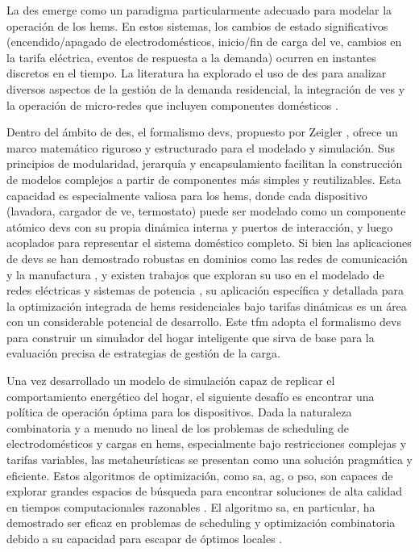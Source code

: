 \documentclass[11pt,a4paper]{book}
\begin{document}
La \gls{des} emerge como un paradigma particularmente adecuado para modelar la operación de los \gls{hems}. En estos sistemas, los cambios de estado significativos (encendido/apagado de electrodomésticos, inicio/fin de carga del \gls{ve}, cambios en la tarifa eléctrica, eventos de respuesta a la demanda) ocurren en instantes discretos en el tiempo. La literatura ha explorado el uso de \gls{des} para analizar diversos aspectos de la gestión de la demanda residencial, la integración de \gls{ves} y la operación de micro-redes que incluyen componentes domésticos \cite{Lasseter2002, Pipattanasomporn2009}.

Dentro del ámbito de \gls{des}, el formalismo \gls{devs}, propuesto por Zeigler \cite{Zeigler2018}, ofrece un marco matemático riguroso y estructurado para el modelado y \mbox{simulación}. Sus principios de modularidad, jerarquía y encapsulamiento \mbox{facilitan} la construcción de modelos complejos a partir de componentes más simples y \mbox{reutilizables}. Esta capacidad es especialmente valiosa para los \gls{hems}, donde cada dispositivo (lavadora, cargador de \gls{ve}, termostato) puede ser modelado como un componente atómico \gls{devs} con su propia dinámica interna y puertos de interacción, y luego acoplados para representar el sistema doméstico completo. Si bien las aplicaciones de \gls{devs} se han demostrado robustas en dominios como las redes de comunicación y la manufactura \cite{Wainer2013, Liu2008}, y existen trabajos que exploran su uso en el modelado de redes eléctricas y sistemas de potencia \cite{AlHammouri2007, Nutaro2010}, su aplicación específica y detallada para la optimización integrada de \gls{hems} residenciales bajo tarifas dinámicas es un área con un considerable potencial de desarrollo. Este \gls{tfm} adopta el formalismo \gls{devs} para construir un simulador del hogar inteligente que sirva de base para la evaluación precisa de estrategias de gestión de la carga.

Una vez desarrollado un modelo de simulación capaz de replicar el comportamiento energético del hogar, el siguiente desafío es encontrar una política de operación óptima para los dispositivos. Dada la naturaleza combinatoria y a menudo no lineal de los problemas de scheduling de electrodomésticos y cargas en \gls{hems}, especialmente bajo restricciones complejas y tarifas variables, las metaheurísticas se presentan como una solución pragmática y eficiente. Estos algoritmos de optimización, como \gls{sa}, \gls{ag}, o \gls{pso}, son capaces de explorar grandes espacios de búsqueda para encontrar soluciones de alta calidad en tiempos computacionales razonables \cite{Talbi2009}. El algoritmo \gls{sa}, en particular, ha demostrado ser eficaz en problemas de scheduling y optimización combinatoria debido a su capacidad para escapar de óptimos locales \cite{kirkpatrick1983, Logenthiran2012}.
\end{document}
